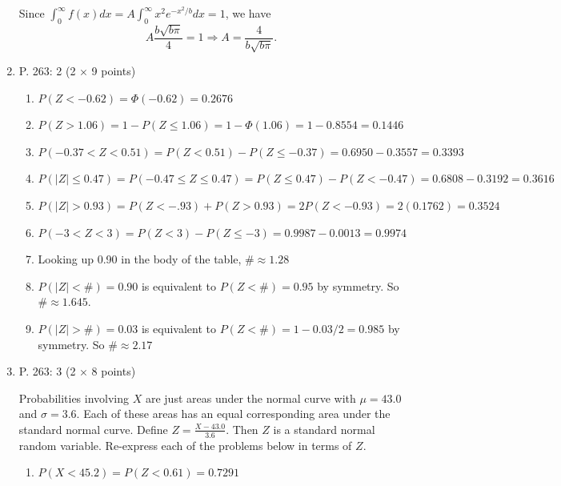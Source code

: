 \documentclass{article}\usepackage[]{graphicx}\usepackage[]{color}
\begin{document}
\begin{enumerate}
{	Since $\int_{0}^\infty f(x) dx = A \int_{0}^\infty x^2 e^{-x^2/b} dx = 1$, we have
	\[A \frac{b\sqrt{b \pi}}{4} = 1 \Rightarrow  A = \frac{4}{b \sqrt{b \pi}}.\]
	
	
	
	}
	
	\item P. 263: 2 (2 $\times$ 9 points)
	
	\begin{enumerate}
	\item $P(Z < -0.62) = \Phi(-0.62) = 0.2676$
	
	\item $P(Z > 1.06) = 1 - P(Z \leq 1.06) = 1 - \Phi(1.06) = 1 - 0.8554 = 0.1446$
	
	\item $P(-0.37 < Z < 0.51) = P(Z < 0.51) - P(Z \leq -0.37) = 0.6950 - 0.3557 = 0.3393$
	
	\item $P(|Z| \leq 0.47) = P(-0.47 \leq Z \leq 0.47) = P(Z \leq 0.47) - P(Z < -0.47) = 0.6808 - 0.3192 = 0.3616$
	
	\item $P(|Z| > 0.93) = P(Z < -.93) + P(Z > 0.93) = 2 P(Z < -0.93) = 2 (0.1762) = 0.3524$
	
	\item $P(-3 < Z < 3) = P(Z < 3) - P(Z \leq -3) = 0.9987 - 0.0013 = 0.9974$
	
	\item Looking up 0.90 in the body of the table, $\# \approx 1.28$
	
	\item $P(|Z| < \#) = 0.90$ is equivalent to $P(Z < \#) = 0.95$ by symmetry. So $\# \approx 1.645$.
	
	\item $P(|Z| > \#) = 0.03$ is equivalent to $P(Z < \#) = 1 - 0.03/2 = 0.985$ by symmetry. So $\# \approx 2.17$ 
	
	\end{enumerate}
	\item P. 263: 3 (2 $\times$ 8 points)

	{\color{red} Probabilities involving $X$ are just areas under the normal curve with $\mu = 43.0$ and $\sigma = 3.6$. Each of these areas has an equal corresponding area under the standard normal curve. Define $Z = \frac{X - 43.0}{3.6}$. Then $Z$ is a standard normal random variable. Re-express each of the problems below in terms of $Z$.  }
		\begin{enumerate}
	\item $P(X < 45.2) = P(Z < 0.61) = 0.7291$
	

\end{enumerate}
\end{enumerate}
\end{document}
